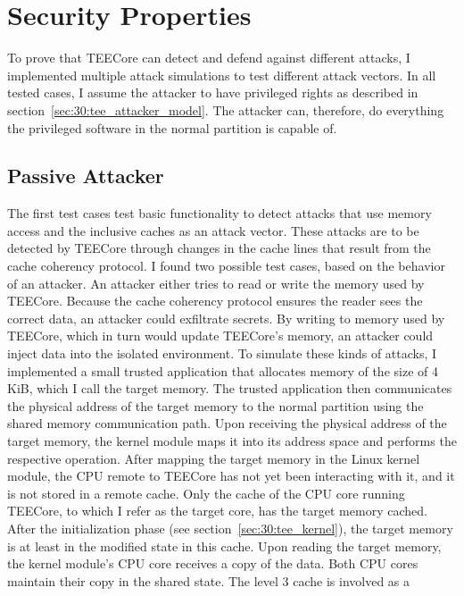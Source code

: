 \section{Security Properties}
\label{eval:sec}
To prove that TEECore can detect and defend against different attacks, I
implemented multiple attack simulations to test different attack vectors. In all
tested cases, I assume the attacker to have privileged rights as described in
section~\ref{sec:30:tee_attacker_model}. The attacker can, therefore, do
everything the privileged software in the normal partition is capable of.\\

\subsection{Passive Attacker}
\label{sec:evaluation:passive}
The first test cases test basic functionality to detect attacks that use memory
access and the inclusive caches as an attack vector. These attacks are to be
detected by TEECore through changes in the cache lines that result from the
cache coherency protocol. I found two possible test cases, based on the behavior
of an attacker. An attacker either tries to read or write the memory used by
TEECore. Because the cache coherency protocol ensures the reader sees the
correct data, an attacker could exfiltrate secrets. By writing to memory used by
TEECore, which in turn would update TEECore's memory, an attacker could inject
data into the isolated environment. To simulate these kinds of attacks, I
implemented a small trusted application that allocates memory of the size of 4
KiB, which I call the target memory. The trusted application then communicates
the physical address of the target memory to the normal partition using the
shared memory communication path. Upon receiving the physical address of the
target memory, the kernel module maps it into its address space and performs the
respective operation. After mapping the target memory in the Linux kernel
module, the CPU remote to TEECore has not yet been interacting with it, and it
is not stored in a remote cache. Only the cache of the CPU core running TEECore,
to which I refer as the target core, has the target memory cached. After the
initialization phase (see section~\ref{sec:30:tee_kernel}), the target memory is
at least in the modified state in this cache. Upon reading the target memory,
the kernel module's CPU core receives a copy of the data. Both CPU cores
maintain their copy in the shared state. The level 3 cache is involved as a
